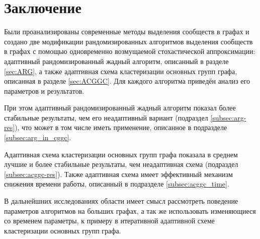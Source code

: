 
\section*{Заключение}

Были проанализированы современные методы выделения сообществ в графах и создано две модификации рандомизированных алгоритмов выделения сообществ в графах с помощью одновременно возмущаемой стохастической аппроксимации: адаптивный рандомизированный жадный алгоритм, описанный в разделе \ref{sec:ARG}, а также адаптивная схема кластеризации основных групп графа, описанная в разделе \ref{sec:ACGGC}. Для каждого алгоритма приведён анализ его параметров и результатов.

При этом адаптивный рандомизированный жадный алгоритм показал более стабильные результаты, чем его неадаптивный вариант (подраздел \ref{subsec:arg-res}), что может в том числе иметь применение, описанное в подразделе \ref{subsec:arg_in_cggc}.

Адаптивная схема кластеризации основных групп графа показала в среднем лучшие и более стабильные результаты, чем неадаптивная схема (подраздел \ref{subsec:acggc-res}). Также адаптивная схема имеет эффективный механизм снижения времени работы, описанный в подразделе \ref{subsec:acggc_time}.

В дальнейшних исследованиях области имеет смысл рассмотреть поведение параметров алгоритмов на больших графах, а так же использовать изменяющиеся со временем параметры, к примеру в итеративной адаптивной схеме кластеризации основных групп графа.